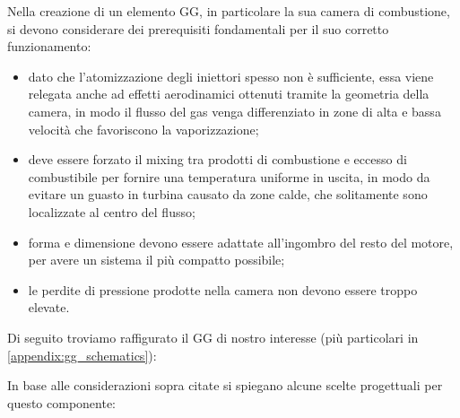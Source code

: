 Nella creazione di un elemento GG, in particolare la sua camera di combustione, si devono considerare dei prerequisiti fondamentali per il suo corretto funzionamento:

\begin{itemize}[wide,itemsep=3pt,topsep=3pt]

\item
dato che l'atomizzazione degli iniettori spesso non è sufficiente, essa viene relegata anche ad effetti aerodinamici ottenuti tramite la geometria della camera, in modo il flusso del gas venga differenziato in zone di alta e bassa velocità che favoriscono la vaporizzazione;

\item
deve essere forzato il mixing tra prodotti di combustione e eccesso di combustibile per fornire una temperatura uniforme in uscita, in modo da evitare un guasto in turbina causato da zone calde, che solitamente sono localizzate al centro del flusso;

\item
forma e dimensione devono essere adattate all'ingombro del resto del motore, per avere un sistema il più compatto possibile;

\item
le perdite di pressione prodotte nella camera non devono essere troppo elevate.

\end{itemize}

Di seguito troviamo raffigurato il GG di nostro interesse (più particolari in \autoref{appendix:gg_schematics}):



In base alle considerazioni sopra citate si spiegano alcune scelte progettuali per questo componente:

